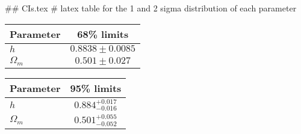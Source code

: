 ## CIs.tex
# latex table for the 1 and 2 sigma distribution of each parameter

\begin{tabular} { l  c}
 Parameter &  68\% limits\\
\hline
{\boldmath$h              $} & $0.8838\pm 0.0085          $\\
{\boldmath$\Omega_m       $} & $0.501\pm 0.027            $\\
\hline
\end{tabular}

\begin{tabular} { l  c}
 Parameter &  95\% limits\\
\hline
{\boldmath$h              $} & $0.884^{+0.017}_{-0.016}   $\\
{\boldmath$\Omega_m       $} & $0.501^{+0.055}_{-0.052}   $\\
\hline
\end{tabular}
